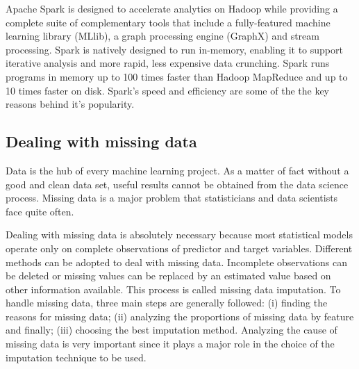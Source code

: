\documentclass[LaM,binding=0.6cm, english]{sapthesis}
\begin{document}
\par Apache Spark is designed to accelerate analytics on Hadoop while providing a complete suite of complementary tools that include a fully-featured machine learning library (MLlib), a graph processing engine (GraphX) and stream processing. Spark is natively designed to run in-memory, enabling it to support iterative analysis and more rapid, less expensive data crunching. Spark runs programs in memory up to 100 times faster than Hadoop MapReduce and up to 10 times faster on disk. Spark's speed and efficiency are some of the the key reasons behind it's popularity. 

\subsection{Dealing with missing data} \label{missing-data}

Data is the hub of every machine learning project. As a matter of fact without a good and clean data set, useful results cannot be obtained from the data science process. Missing data is a major problem that statisticians and data scientists face quite often.

\par Dealing with missing data is absolutely necessary because most statistical models operate only on complete observations of predictor and target variables. Different methods can be adopted to deal with missing data. Incomplete observations can be deleted or missing values can be replaced by an estimated value based on other information available. This process is called missing data imputation.\cite{Salgado2016} To handle missing data, three main steps are generally followed: (i) finding the reasons for missing data; (ii) analyzing the proportions of missing data by feature and finally; (iii) choosing the best imputation method. Analyzing the cause of missing data is very important since it plays a major role in the choice of the imputation technique to be used.

\end{document}

